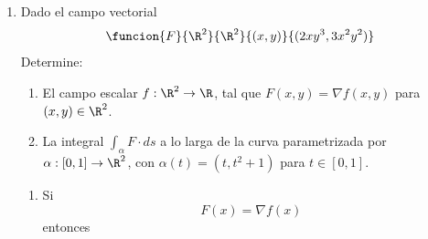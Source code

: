 \documentclass[a4,11pt]{aleph-examen}
\begin{document}
\begin{preguntas}
\begin{respuesta}
\begin{respuesta}
\begin{respuesta}
\begin{enumerate}

\item
    Dado el campo vectorial
    \[
        \funcion{F}{\R^2}{\R^2}{(x,y)}{(2xy^3,3x^2 y^2)}
    \]
    Determine:
    \begin{enumerate}
        \item El campo escalar $f:\R^2\rightarrow \R$, tal que $F(x,y)=\nabla f(x,y)$ para $(x,y)\in\R^2$.
        \item La integral $\int_\alpha F\cdot ds$ a lo larga de la curva parametrizada por $\alpha:[0,1]\rightarrow \R^2$, con $\alpha(t)=(t,t^2+1)$ para $t\in[0,1]$.
    \end{enumerate}

\begin{respuesta}
\begin{enumerate}
	\item Si 
	\[
	    F(x)=\nabla f(x)
	\]
	entonces
	

\end{enumerate}
\end{respuesta}
\end{enumerate}
\end{respuesta}
\end{respuesta}
\end{respuesta}
\end{preguntas}
\end{document}
